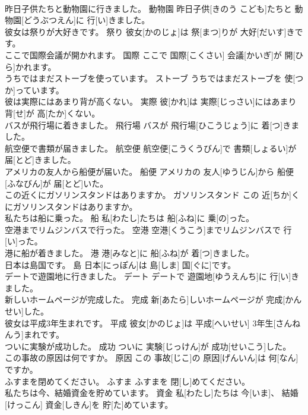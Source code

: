 \documentclass[8pt]{extreport}
\begin{document}
\begin{CJK}{UTF8}{min}
\\	昨日子供たちと動物園に行きました。	動物園	昨日子供[きのう こども]たちと 動物園[どうぶつえん]に 行[い]きました。	
\\	彼女は祭りが大好きです。	祭り	彼女[かのじょ]は 祭[まつ]りが 大好[だいす]きです。	
\\	ここで国際会議が開かれます。	国際	ここで 国際[こくさい] 会議[かいぎ]が 開[ひら]かれます。	
\\	うちではまだストーブを使っています。	ストーブ	うちではまだストーブを 使[つか]っています。	
\\	彼は実際にはあまり背が高くない。	実際	彼[かれ]は 実際[じっさい]にはあまり 背[せ]が 高[たか]くない。	
\\	バスが飛行場に着きました。	飛行場	バスが 飛行場[ひこうじょう]に 着[つ]きました。	
\\	航空便で書類が届きました。	航空便	航空便[こうくうびん]で 書類[しょるい]が 届[とど]きました。	
\\	アメリカの友人から船便が届いた。	船便	アメリカの 友人[ゆうじん]から 船便[ふなびん]が 届[とど]いた。	
\\	この近くにガソリンスタンドはありますか。	ガソリンスタンド	この 近[ちか]くにガソリンスタンドはありますか。	
\\	私たちは船に乗った。	船	私[わたし]たちは 船[ふね]に 乗[の]った。	
\\	空港までリムジンバスで行った。	空港	空港[くうこう]までリムジンバスで 行[い]った。	
\\	港に船が着きました。	港	港[みなと]に 船[ふね]が 着[つ]きました。	
\\	日本は島国です。	島	日本[にっぽん]は 島[しま] 国[ぐに]です。	
\\	デートで遊園地に行きました。	デート	デートで 遊園地[ゆうえんち]に 行[い]きました。	
\\	新しいホームページが完成した。	完成	新[あたら]しいホームページが 完成[かんせい]した。	
\\	彼女は平成3年生まれです。	平成	彼女[かのじょ]は 平成[へいせい] 3年生[さんねんう]まれです。	
\\	ついに実験が成功した。	成功	ついに 実験[じっけん]が 成功[せいこう]した。	
\\	この事故の原因は何ですか。	原因	この 事故[じこ]の 原因[げんいん]は 何[なん]ですか。	
\\	ふすまを閉めてください。	ふすま	ふすまを 閉[し]めてください。	
\\	私たちは今、結婚資金を貯めています。	資金	私[わたし]たちは 今[いま]、 結婚[けっこん] 資金[しきん]を 貯[た]めています。	

\end{CJK}
\end{document}
